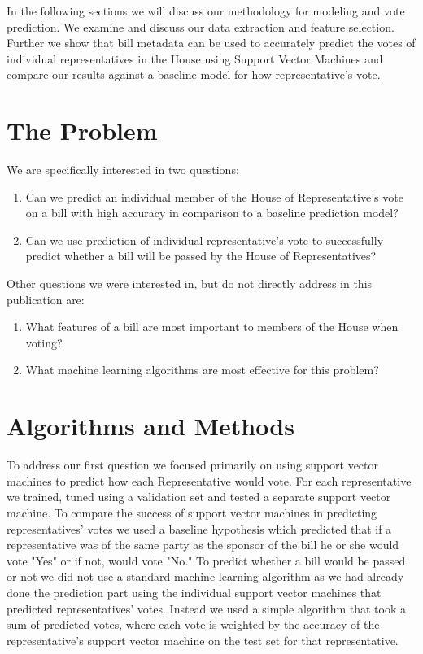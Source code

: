 \documentclass[11pt,letterpaper,twocolumn]{article}
\begin{document}
	In the following sections we will discuss our methodology for modeling and vote prediction. We examine and discuss our data extraction and feature selection. Further we show that bill metadata can be used to accurately predict the votes of individual representatives in the House using Support Vector Machines and compare our results against a baseline model for how representative's vote. 

\section{The Problem}
We are specifically interested in two questions: 
\begin{enumerate}
\item Can we predict an individual member of the House of Representative's vote on a bill with high accuracy in comparison to a baseline prediction model?
\item Can we use prediction of individual representative's vote to successfully predict whether a bill will be passed by the House of Representatives?
\end{enumerate}

\noindent Other questions we were interested in, but do not directly address in this publication are:

\begin{enumerate}
\item What features of a bill are most important to members of the House when voting?
\item What machine learning algorithms are most effective for this problem?
\end{enumerate}

\section{Algorithms and Methods}
To address our first question we focused primarily on using support vector machines to predict how each Representative would vote. For each representative we trained, tuned using a validation set and tested a separate support vector machine. To compare the success of support vector machines in predicting representatives' votes we used a baseline hypothesis which predicted that if a representative was of the same party as the sponsor of the bill he or she would vote "Yes" or if not, would vote "No." To predict whether a bill would be passed or not we did not use a standard machine learning algorithm as we had already done the prediction part using the individual support vector machines that predicted representatives' votes. Instead we used a simple algorithm that took a sum of predicted votes, where each vote is weighted by the accuracy of the representative's support vector machine on the test set for that representative. 
\end{document}
